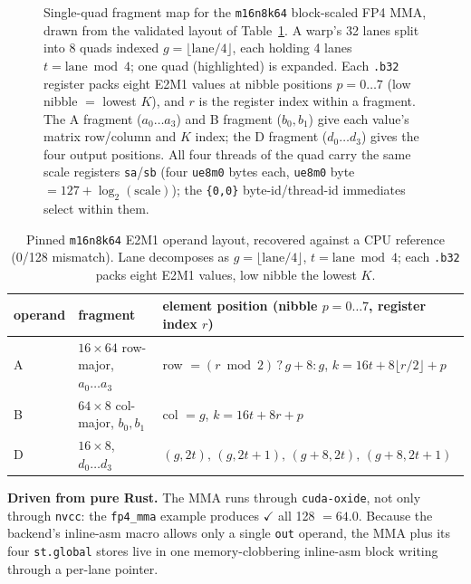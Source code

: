 \documentclass[11pt]{article}
\begin{document}
\begin{figure}[t]
{%
}
\caption{Single-quad fragment map for the \texttt{m16n8k64} block-scaled FP4 MMA, drawn from the validated layout of Table~\ref{tab:fp4layout}. A warp's 32 lanes split into 8 quads indexed $g=\lfloor\text{lane}/4\rfloor$, each holding 4 lanes $t=\text{lane}\bmod4$; one quad (highlighted) is expanded. Each \texttt{.b32} register packs eight E2M1 values at nibble positions $p=0\ldots7$ (low nibble $=$ lowest $K$), and $r$ is the register index within a fragment. The A fragment ($a_0\ldots a_3$) and B fragment ($b_0,b_1$) give each value's matrix row/column and $K$ index; the D fragment ($d_0\ldots d_3$) gives the four output positions. All four threads of the quad carry the same scale registers \texttt{sa}/\texttt{sb} (four \texttt{ue8m0} bytes each, \texttt{ue8m0} byte $=127+\log_2(\text{scale})$); the \texttt{\{0,0\}} byte-id/thread-id immediates select within them.}
\label{fig:fp4layout}
\end{figure}

\begin{table}[t]\centering
\begin{tabular}{lll}
\toprule
operand & fragment & element position (nibble $p=0\ldots7$, register index $r$)\\
\midrule
A & $16\times64$ row-major, $a_0\ldots a_3$ & row $=(r\bmod2)\,?\,g{+}8:g$, \quad $k=16t+8\lfloor r/2\rfloor+p$\\
B & $64\times8$ col-major, $b_0,b_1$ & col $=g$, \quad $k=16t+8r+p$\\
D & $16\times8$, $d_0\ldots d_3$ & $(g,2t),\,(g,2t{+}1),\,(g{+}8,2t),\,(g{+}8,2t{+}1)$\\
\bottomrule
\end{tabular}
\caption{Pinned \texttt{m16n8k64} E2M1 operand layout, recovered against a CPU reference (0/128 mismatch). Lane decomposes as $g=\lfloor\text{lane}/4\rfloor$, $t=\text{lane}\bmod4$; each \texttt{.b32} packs eight E2M1 values, low nibble the lowest $K$.}
\label{tab:fp4layout}
\end{table}

\textbf{Driven from pure Rust.} The MMA runs through \texttt{cuda-oxide}, not only through \texttt{nvcc}: the \texttt{fp4\_mma} example produces $\checkmark$ all 128 $= 64.0$. Because the backend's inline-asm macro allows only a single \texttt{out} operand, the MMA plus its four \texttt{st.global} stores live in one memory-clobbering inline-asm block writing through a per-lane pointer.
\end{document}
